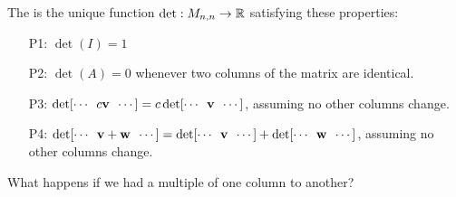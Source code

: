 \begin{applicationActivities}
\begin{definition}
The  is the unique function
\(\det:M_{n,n}\to\IR\) satisfying these  properties:
\begin{enumerate}
\item [P1:] $\det(I)=1$
\item [P2:] $\det(A)=0$ whenever two columns of the matrix are identical.
\item[P3:]
\(\det[\cdots\hspace{0.5em}c\vec{v}\hspace{0.5em}\cdots]=
c\det[\cdots\hspace{0.5em}\vec{v}\hspace{0.5em}\cdots]\), assuming no other columns change.
\item[P4:]
\(\det[\cdots\hspace{0.5em}\vec{v}+\vec{w}\hspace{0.5em}\cdots]=
\det[\cdots\hspace{0.5em}\vec{v}\hspace{0.5em}\cdots]+
\det[\cdots\hspace{0.5em}\vec{w}\hspace{0.5em}\cdots]\), assuming no other columns change.
\end{enumerate}
\end{definition}

%

\begin{observation}
What happens if we had a multiple of one column to another?


\end{observation}
\end{applicationActivities}
